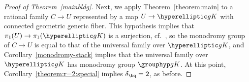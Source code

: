 \begin{proof}[Proof of Theorem~\ref{mainbldg}]
Next, we apply Theorem~\ref{theorem:main} to a rational family $C \rightarrow U$ represented by a map $U \to \hyperelliptic g K$ with connected geometric generic fiber. This hypothesis implies that $\pi_1(U) \to \pi_1(\hyperelliptic g K)$ is a surjection, cf.\ \cite[Corollary 5.3]{landesman-swaminathan-tao-xu:rational-families}, so the monodromy group of $C \to U$ is equal to that of the universal family over $\hyperelliptic g K$, and Corollary~\ref{monodromy-stack} implies that the universal family over $\hyperelliptic g K$ has monodromy group $\grouphyp g K$. At this point, Corollary~\ref{theorem:r=2:special} implies $\delta_\bq = 2$, as before. 
\begin{comment}
\textcolor[rgb]{1,0,0}{To conclude, we only need deal with the case $g = 1$.
We separate this case mostly for notational reasons, as $\Sp_2(\mathbb Z/2 \mathbb Z) \simeq S_3$,
and so there is no copy of $S_{2 \cdot 1 + 2}$ in $\Sp_2(\mathbb Z/2 \mathbb Z)$.
The proof is then essentially the same as the $g \geq 2$ case, where we adjust
two of the inputs:
First, ~\cite[Th\'eor\`eme 1]{acampo:tresses-monodromie-et-le-groupe-symplectique} states that in the case $g= 1$, the geometric monodromy of $\standardFamily 1 2 K$ is $S_3$ instead using 
Theorem~\ref{theorem:main} as we did in the $g \geq 2$ case, we use
\cite[Theorem 1.14]{zywina2010hilbert} for the case $K \neq \mathbb Q$
and \cite[Theorem 1.15]{zywina2010hilbert} for the case $K = \mathbb Q$,
which is analogous to Theorem~\ref{theorem:main} in the case $g=1$, but
yields better estimates for the error term.}
\end{comment}
\end{proof}
